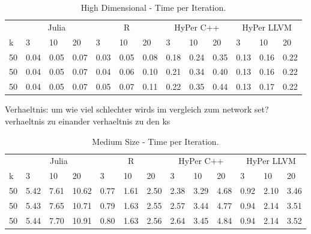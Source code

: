 \begin{table}[htsb]
  \caption[High Dimensional - Time per Iteration]{High Dimensional - Time per Iteration.}
  \label{tab:highdim_all}
  \centering
  \begin{tabular}{l l l l l l l l l l l l l}
    \toprule
      & \multicolumn{3}{c}{Julia} & \multicolumn{3}{c}{R} & \multicolumn{3}{c}{HyPer C++} & \multicolumn{3}{c}{HyPer LLVM}  \\
      k & 3 & 10 & 20 & 3 & 10 & 20 & 3 & 10 & 20 & 3 & 10 & 20 \\
    \midrule
      50  & 0.04 & 0.05 & 0.07 & 0.03 & 0.05 & 0.08 & 0.18 & 0.24 & 0.35 & 0.13 & 0.16 & 0.22 \\
      50  & 0.04 & 0.05 & 0.07 & 0.04 & 0.06 & 0.10 & 0.21 & 0.34 & 0.40 & 0.13 & 0.16 & 0.22 \\
      50  & 0.04 & 0.05 & 0.07 & 0.05 & 0.07 & 0.11 & 0.22 & 0.35 & 0.44 & 0.13 & 0.17 & 0.22 \\
    \bottomrule
  \end{tabular}
\end{table}

Verhaeltnis: um wie viel schlechter wirds im vergleich zum network set?
verhaeltnis zu einander
verhaeltnis zu den ks



\begin{table}[htsb]
  \caption[Medium Size - Time per Iteration]{Medium Size - Time per Iteration.}
  \label{tab:medium_all}
  \centering
  \begin{tabular}{l l l l l l l l l l l l l}
    \toprule
      & \multicolumn{3}{c}{Julia} & \multicolumn{3}{c}{R} & \multicolumn{3}{c}{HyPer C++} & \multicolumn{3}{c}{HyPer LLVM}  \\
      k & 3 & 10 & 20 & 3 & 10 & 20 & 3 & 10 & 20 & 3 & 10 & 20 \\
    \midrule
      50  & 5.42 & 7.61 & 10.62 & 0.77 & 1.61 & 2.50 & 2.38 & 3.29 & 4.68 & 0.92 & 2.10 & 3.46 \\
      50  & 5.43 & 7.65 & 10.71 & 0.79 & 1.63 & 2.55 & 2.57 & 3.44 & 4.77 & 0.94 & 2.14 & 3.51 \\
      50  & 5.44 & 7.70 & 10.91 & 0.80 & 1.63 & 2.56 & 2.64 & 3.45 & 4.84 & 0.94 & 2.14 & 3.52 \\
    \bottomrule
  \end{tabular}
\end{table}



